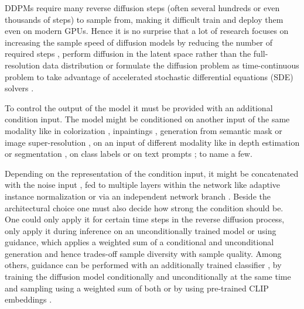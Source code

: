 DDPMs require many reverse diffusion steps (often several hundreds or even thousands of steps) to sample from, making it difficult train and deploy them even on modern GPUs. Hence it is no surprise that a lot of research focuses on increasing the sample speed of diffusion models by reducing the number of required steps \citep{song_denoising_2022, xiao_tackling_2022, nichol_improved_2021, salimans_progressive_2022,chung_come-closer-diffuse-faster_2022}, perform diffusion in the latent space rather than the full-resolution data distribution \citep{preechakul_diffusion_2022,rombach_high-resolution_2022,sinha_d2c_2021, gu_vector_2022, tang_improved_2023} or formulate the diffusion problem as time-continuous problem to take advantage of accelerated stochastic differential equations (SDE) solvers \citep{song_score-based_2021,song_maximum_2021, song_improved_2020,karras_elucidating_2022}.

To control the output of the model it must be provided with an additional condition input. The model might be conditioned on another input of the same modality like in colorization \citep{saharia_palette_2022}, inpaintings \citep{batzolis_conditional_2021}, generation from semantic mask \citep{meng_sdedit_2022} or image super-resolution \citep{saharia_image_2021,ho_cascaded_2021}, on an input of different modality like in depth estimation \citep{duan_diffusiondepth_2023} or segmentation \citep{baranchuk_label-efficient_2022}, on class labels \citep{dhariwal_diffusion_2021} or on text prompts \citep{ramesh_hierarchical_2022, nichol_towards_2022,saharia_photorealistic_2022}; to name a few.

Depending on the representation of the condition input, it might be concatenated with the noise input \citep{batzolis_conditional_2021}, fed to multiple layers within the network like adaptive instance normalization \citep{karras_style-based_2019} or via an independent network branch \citep{zhang_adding_2023}. Beside the architectural choice one must also decide how strong the condition should be. One could only apply it for certain time steps in the reverse diffusion process, only apply it during inference on an unconditionally trained model \citep{choi_ilvr_2021} or using guidance, which applies a weighted sum of a conditional and unconditional generation and hence trades-off sample diversity with sample quality. Among others, guidance can be performed with an additionally trained classifier \citep{nichol_improved_2021}, by training the diffusion model conditionally and unconditionally at the same time and sampling using a weighted sum of both \citep{ho_classifier-free_2022} or by using pre-trained CLIP embeddings \citep{nichol_towards_2022,ramesh_hierarchical_2022}.


